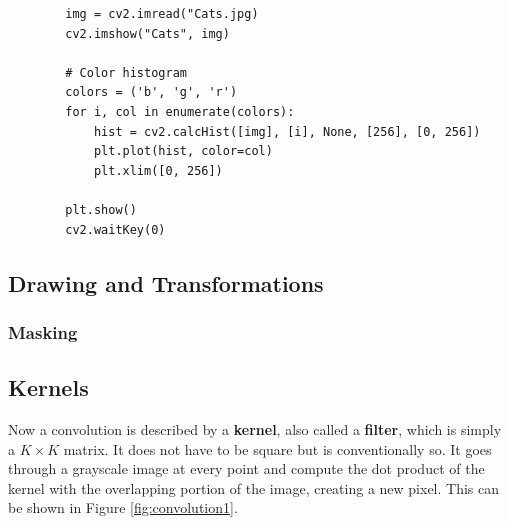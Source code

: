 \documentclass{article}
\begin{document}
      \begin{lstlisting}
        img = cv2.imread("Cats.jpg)
        cv2.imshow("Cats", img) 

        # Color histogram 
        colors = ('b', 'g', 'r') 
        for i, col in enumerate(colors): 
            hist = cv2.calcHist([img], [i], None, [256], [0, 256]) 
            plt.plot(hist, color=col) 
            plt.xlim([0, 256]) 
            
        plt.show() 
        cv2.waitKey(0) 
      \end{lstlisting}

  \subsection{Drawing and Transformations}

    \subsubsection{Masking}

  \subsection{Kernels}

    Now a convolution is described by a \textbf{kernel}, also called a \textbf{filter}, which is simply a $K \times K$ matrix. It does not have to be square but is conventionally so. It goes through a grayscale image at every point and compute the dot product of the kernel with the overlapping portion of the image, creating a new pixel. This can be shown in Figure \ref{fig:convolution1}. 
\end{document}
